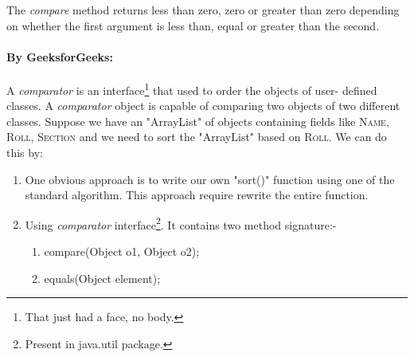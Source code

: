 The \textit{compare} method returns less than zero, zero or greater than zero depending on whether the first argument is less than, equal or greater than the second.
\paragraph{By GeeksforGeeks:}
A \textit{comparator} is an interface\footnote{That just had a face, no body.} that used to order the objects of user-	defined classes. A \textit{comparator} object is capable of comparing two objects of two different classes. Suppose we have an "ArrayList" of objects containing fields like \textsc{Name, Roll, Section} and we need to sort the "ArrayList" based on \textsc{Roll}. We can do this by:
	\begin{enumerate}
		\item[Method 1:] One obvious approach is to write our own "sort()" function using one of the standard algorithm. This approach require rewrite the entire function.
		\item[Method 2:] Using \textit{comparator} interface\footnote{Present in java.util package.}. It contains two method signature:-
		\begin{enumerate}
			\item compare(Object o1, Object o2);
			\item equals(Object element);
		\end{enumerate}
	\end{enumerate}
	
